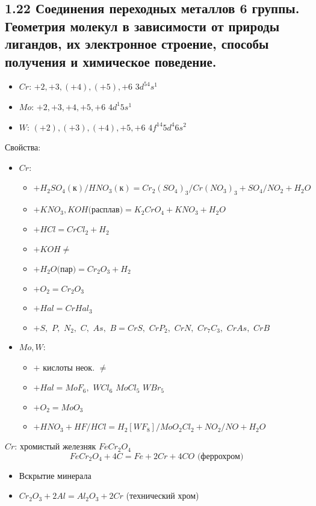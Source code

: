 \subsection{1.22 Соединения переходных металлов 6 группы. Геометрия молекул в зависимости от природы лигандов, их электронное строение, способы получения и химическое поведение.}
\begin{itemize}
	\item $Cr$: $+2, +3, (+4), (+5), +6$ \quad \quad $3d^54s^1$
	\item $Mo$: $+2, +3, +4, +5, +6$ \quad $4d^1 5s^1$
	\item $W$: $(+2), (+3), (+4), +5, +6$ \quad $4f^{14} 5d^4 6s^2$
\end{itemize}
Свойства:
\begin{itemize}
	\item $Cr$:
	\begin{itemize}
		\item $+ H_2SO_4 (\text{к})/HNO_3(\text{к}) = Cr_2(SO_4)_3 / Cr(NO_3)_3 + SO_4/NO_2 + H_2O $
		\item $+ KNO_3, KOH \text{(расплав)} = K_2CrO_4 + KNO_3 + H_2O$
		\item $+ HCl = CrCl_2 + H_2$
		\item $+ KOH \not =$
		\item $+ H_2O \text{(пар)} = Cr_2O_3 + H_2$	
		\item $+ O_2 = Cr_2O_3$
		\item $+ Hal = CrHal_3 $
		\item $+ S, \,\, P, \,\, N_2, \,\, C, \,\, As, \,\, B = CrS, \,\, CrP_2, \,\, CrN,\,\, Cr_7C_3, \,\, CrAs,\,\, CrB $	
	\end{itemize}
	\item $Mo, W$:
	\begin{itemize}
		\item $+$ кислоты неок. $ \not = $
		\item $+ Hal = MoF_6, \,\, WCl_6 \,\, MoCl_5 \,\, WBr_5 $
		\item $+ O_2 = MoO_3$
		\item $+ HNO_3 + HF/HCl = H_2\left[WF_8 \right]/MoO_2Cl_2 + NO_2/NO + H_2O $		
	\end{itemize}
\end{itemize}
$Cr$: хромистый железняк $FeCr_2O_4$
\[
FeCr_2O_4 + 4C = Fe + 2Cr + 4CO \text{ (феррохром)}
\]
\begin{itemize}
	\item Вскрытие минерала
	\item $Cr_2O_3 + 2 Al = Al_2O_3 + 2 Cr$ (технический хром)
\end{itemize}
